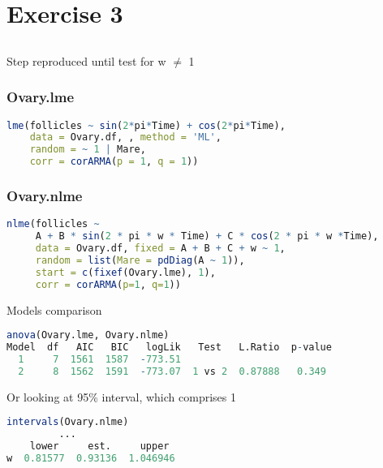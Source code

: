 \documentclass[a4paper,12pt]{article}
\begin{document}
	\newpage
	\section{Exercise 3}
	
	\subsection{}
	Step reproduced until test for w $\neq$ 1
	
	\subsubsection*{Ovary.lme}
	\begin{lstlisting}[language=R]
lme(follicles ~ sin(2*pi*Time) + cos(2*pi*Time),
    data = Ovary.df, , method = 'ML',
    random = ~ 1 | Mare,
    corr = corARMA(p = 1, q = 1))
	\end{lstlisting}
	
	\subsubsection*{Ovary.nlme}
	\begin{lstlisting}[language=R]
nlme(follicles ~ 
     A + B * sin(2 * pi * w * Time) + C * cos(2 * pi * w *Time),
     data = Ovary.df, fixed = A + B + C + w ~ 1,
     random = list(Mare = pdDiag(A ~ 1)),
     start = c(fixef(Ovary.lme), 1),
     corr = corARMA(p=1, q=1))
	\end{lstlisting}
	
	Models comparison
	\begin{lstlisting}[language=R]
anova(Ovary.lme, Ovary.nlme)
Model  df   AIC   BIC   logLik   Test   L.Ratio  p-value
  1     7  1561  1587  -773.51                         
  2     8  1562  1591  -773.07  1 vs 2  0.87888   0.349
	\end{lstlisting}
	
	Or looking at 95\% interval, which comprises 1
	\begin{lstlisting}[language=R]
intervals(Ovary.nlme)
         ...
    lower     est.     upper
w  0.81577  0.93136  1.046946
	\end{lstlisting}
	
	\newpage
\end{document}

